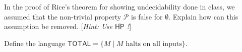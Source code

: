\documentclass[11pt, a4paper,answers]{exam}
\newcommand{\HP}{\mathsf{HP}}
\newcommand{\TOTAL}{\mathsf{TOTAL}}
\begin{document}
\begin{questions}
 In the proof of Rice's theorem for showing undecidability done in class,  we assumed that the non-trivial property $\mathcal{P}$ is false for $\emptyset$.  Explain how can this assumption be removed.  [\textit{Hint: Use $\overline{\HP}$ !}]





 Define the language $\TOTAL = \{M \mid \text{$M$ halts on all inputs} \}$.


\end{questions}
\end{document}
